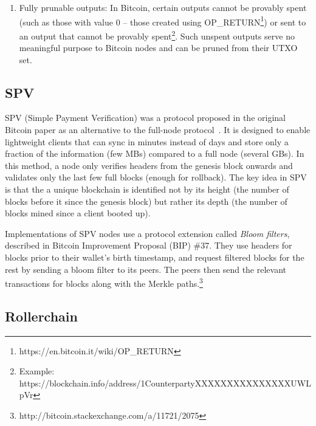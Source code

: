 \documentclass[]{report}   %
\begin{document}
\begin{enumerate}
	\item Fully prunable outputs: In Bitcoin, certain outputs cannot be provably spent (such as those with value 0 -- those created using OP\_RETURN\footnote{https://en.bitcoin.it/wiki/OP\_RETURN}) or sent to an output that cannot be provably spent\footnote{Example: https://blockchain.info/address/1CounterpartyXXXXXXXXXXXXXXXUWLpVr}. Such unspent outputs serve no meaningful purpose to Bitcoin nodes and can be pruned from their UTXO set. 
\end{enumerate}




\subsection{SPV}

SPV (Simple Payment Verification) was a protocol proposed in the original Bitcoin paper as an alternative to the full-node protocol~\cite{Nakamoto2008}. It is designed to enable lightweight clients that can sync in minutes instead of days and store only a fraction of the information (few MBs) compared to a full node (several GBs).
In this method, a node only verifies headers from the genesis block onwards and validates only the last few full blocks (enough for rollback). 
The key idea in SPV is that the a unique blockchain is identified not by its height (the number of blocks before it since the genesis block) but rather its depth (the number of blocks mined since a client booted up). 

Implementations of SPV nodes use a protocol extension called {\em Bloom filters}, described in Bitcoin Improvement Proposal (BIP) \#37. They use headers for blocks prior to their wallet's birth timestamp, and request filtered blocks for the rest by sending a bloom filter to its peers. The peers then send the relevant transactions for blocks along with the Merkle paths.\footnote{http://bitcoin.stackexchange.com/a/11721/2075}

\subsection{Rollerchain}
\end{document}
